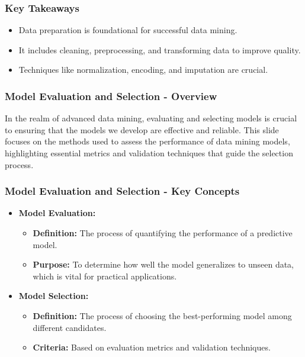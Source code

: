 \documentclass{beamer}
\begin{document}
\begin{frame}
    \frametitle{Key Takeaways}
    \begin{itemize}
        \item Data preparation is foundational for successful data mining.
        \item It includes cleaning, preprocessing, and transforming data to improve quality.
        \item Techniques like normalization, encoding, and imputation are crucial.
    \end{itemize}
\end{frame}

\begin{frame}[fragile]
    \frametitle{Model Evaluation and Selection - Overview}
    In the realm of advanced data mining, evaluating and selecting models is crucial to ensuring that the models we develop are effective and reliable. 
    This slide focuses on the methods used to assess the performance of data mining models, highlighting essential metrics and validation techniques that guide the selection process.
\end{frame}

\begin{frame}[fragile]
    \frametitle{Model Evaluation and Selection - Key Concepts}
    \begin{itemize}
        \item \textbf{Model Evaluation:}
        \begin{itemize}
            \item \textbf{Definition:} The process of quantifying the performance of a predictive model.
            \item \textbf{Purpose:} To determine how well the model generalizes to unseen data, which is vital for practical applications.
        \end{itemize}
        
        \item \textbf{Model Selection:}
        \begin{itemize}
            \item \textbf{Definition:} The process of choosing the best-performing model among different candidates.
            \item \textbf{Criteria:} Based on evaluation metrics and validation techniques.
        \end{itemize}
    \end{itemize}
\end{frame}
\end{document}
